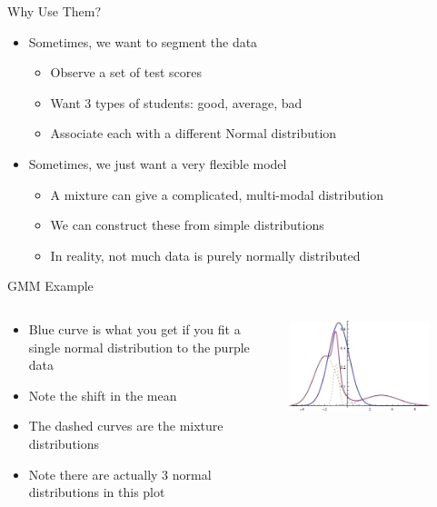 \documentclass[aspectratio=169]{beamer}
\begin{document}
\begin{frame}{Why Use Them?}

\begin{itemize}
	\item Sometimes, we want to segment the data
	\begin{itemize}
		\item Observe a set of test scores
		\item Want 3 types of students: good, average, bad
		\item Associate each with a different Normal distribution
	\end{itemize}
	\item Sometimes, we just want a very flexible model
	\begin{itemize}
		\item A mixture can give a complicated, multi-modal distribution
		\item We can construct these from simple distributions
		\item In reality, not much data is purely normally distributed
	\end{itemize}
\end{itemize}
\end{frame}
\begin{frame}{GMM Example}

\begin{columns}
\begin{column}{0.5\textwidth}
\begin{itemize}
	\item Blue curve is what you get if you fit a single normal distribution to the purple data 
	\item Note the shift in the mean
	\item The dashed curves are the mixture distributions
	\item Note there are actually 3 normal distributions in this plot
\end{itemize}
\end{column}
\begin{column}{0.5\textwidth}
\includegraphics[width=0.8\textwidth]{lectMM/W2PQO.png}
\end{column}
\end{columns}
\end{frame}
\end{document}
